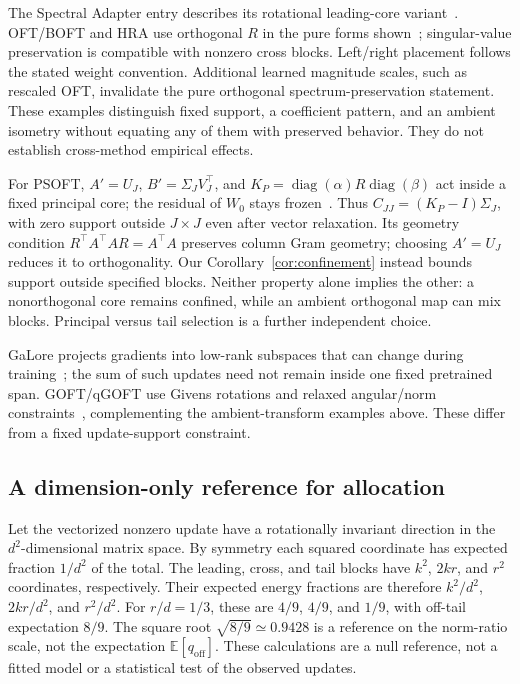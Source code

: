 \documentclass{article}
\newcommand{\off}{\mathrm{off}}
\newcommand{\diag}{\operatorname{diag}}
\begin{document}
The Spectral Adapter entry describes its rotational leading-core variant~\citep{zhang2024spectral}. OFT/BOFT and HRA use orthogonal $R$ in the pure forms shown~\citep{qiu2023oft,liu2024boft,yuan2024hra}; singular-value preservation is compatible with nonzero cross blocks. Left/right placement follows the stated weight convention. Additional learned magnitude scales, such as rescaled OFT, invalidate the pure orthogonal spectrum-preservation statement. These examples distinguish fixed support, a coefficient pattern, and an ambient isometry without equating any of them with preserved behavior. They do not establish cross-method empirical effects.

For PSOFT, $A'=U_J$, $B'=\Sigma_JV_J^\top$, and $K_P=\diag(\alpha)R\diag(\beta)$ act inside a fixed principal core; the residual of $W_0$ stays frozen~\citep{wu2026psoft}. Thus $C_{JJ}=(K_P-I)\Sigma_J$, with zero support outside $J\times J$ even after vector relaxation. Its geometry condition $R^\top A^\top AR=A^\top A$ preserves column Gram geometry; choosing $A'=U_J$ reduces it to orthogonality. Our Corollary~\ref{cor:confinement} instead bounds support outside specified blocks. Neither property alone implies the other: a nonorthogonal core remains confined, while an ambient orthogonal map can mix blocks. Principal versus tail selection is a further independent choice.

GaLore projects gradients into low-rank subspaces that can change during training~\citep{zhao2024galore}; the sum of such updates need not remain inside one fixed pretrained span. GOFT/qGOFT use Givens rotations and relaxed angular/norm constraints~\citep{ma2024qgoft}, complementing the ambient-transform examples above. These differ from a fixed update-support constraint.

\subsection{A dimension-only reference for allocation}
\label{app:dimension}
Let the vectorized nonzero update have a rotationally invariant direction in the $d^2$-dimensional matrix space. By symmetry each squared coordinate has expected fraction $1/d^2$ of the total. The leading, cross, and tail blocks have $k^2$, $2kr$, and $r^2$ coordinates, respectively. Their expected energy fractions are therefore $k^2/d^2$, $2kr/d^2$, and $r^2/d^2$. For $r/d=1/3$, these are $4/9$, $4/9$, and $1/9$, with off-tail expectation $8/9$. The square root $\sqrt{8/9}\simeq0.9428$ is a reference on the norm-ratio scale, not the expectation $\mathbb E[q_{\off}]$. These calculations are a null reference, not a fitted model or a statistical test of the observed updates.
\end{document}
